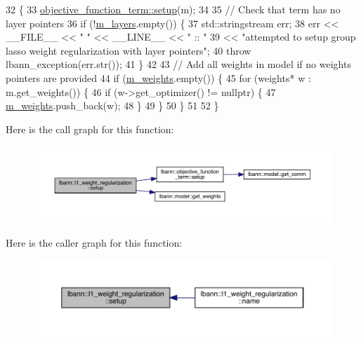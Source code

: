 \begin{DoxyCode}
32                                              \{
33   \hyperlink{classlbann_1_1objective__function__term_a6c8dbdf18aac8676098189fb7b178e91}{objective\_function\_term::setup}(m);
34 
35   \textcolor{comment}{// Check that term has no layer pointers}
36   \textcolor{keywordflow}{if} (!\hyperlink{classlbann_1_1objective__function__term_a9269cf0a237eacd1e220ba2739f44334}{m\_layers}.empty()) \{
37     std::stringstream err;
38     err << \_\_FILE\_\_ << \textcolor{stringliteral}{" "} << \_\_LINE\_\_ << \textcolor{stringliteral}{" :: "}
39         << \textcolor{stringliteral}{"attempted to setup group lasso weight regularization with layer pointers"};
40     \textcolor{keywordflow}{throw} lbann\_exception(err.str());
41   \}
42 
43   \textcolor{comment}{// Add all weights in model if no weights pointers are provided}
44   \textcolor{keywordflow}{if} (\hyperlink{classlbann_1_1objective__function__term_a1d601c29153ae9cb54c585887608f2bf}{m\_weights}.empty()) \{
45     \textcolor{keywordflow}{for} (weights* w : m.get\_weights()) \{
46       \textcolor{keywordflow}{if} (w->get\_optimizer() != \textcolor{keyword}{nullptr}) \{
47         \hyperlink{classlbann_1_1objective__function__term_a1d601c29153ae9cb54c585887608f2bf}{m\_weights}.push\_back(w);
48       \}
49     \}
50   \}
51 
52 \}
\end{DoxyCode}
Here is the call graph for this function\+:\nopagebreak
\begin{figure}[H]
\begin{center}
\leavevmode
\includegraphics[width=350pt]{classlbann_1_1l1__weight__regularization_afcd238514ad132d66609efbb30de25ec_cgraph}
\end{center}
\end{figure}
Here is the caller graph for this function\+:\nopagebreak
\begin{figure}[H]
\begin{center}
\leavevmode
\includegraphics[width=350pt]{classlbann_1_1l1__weight__regularization_afcd238514ad132d66609efbb30de25ec_icgraph}
\end{center}
\end{figure}
\mbox{\label{classlbann_1_1l1__weight__regularization_ace2c0fe490dd1e630460063b6df23597}} 
